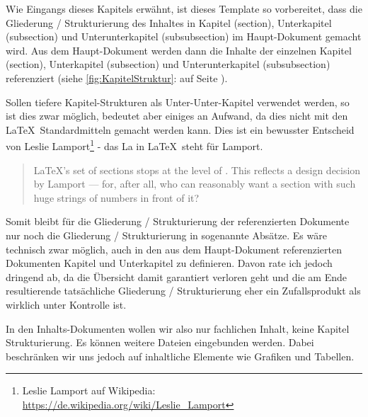 
Wie Eingangs dieses Kapitels erwähnt, ist dieses Template so vorbereitet, dass die Gliederung / Strukturierung des Inhaltes in Kapitel (section), Unterkapitel (subsection) und Unterunterkapitel (subsubsection) im Haupt-Dokument gemacht wird. Aus dem Haupt-Dokument werden dann die Inhalte der einzelnen  Kapitel (section), Unterkapitel (subsection) und Unterunterkapitel (subsubsection) referenziert (siehe \cref{fig:KapitelStruktur}:  auf Seite \pageref{fig:KapitelStruktur}).

Sollen tiefere Kapitel-Strukturen als Unter-Unter-Kapitel verwendet werden, so ist dies zwar möglich, bedeutet aber einiges an Aufwand, da dies nicht mit den \LaTeX\ Standardmitteln gemacht werden kann. Dies ist ein bewusster Entscheid von Leslie Lamport\footnote{Leslie Lamport auf Wikipedia: \url{https://de.wikipedia.org/wiki/Leslie_Lamport}} - das La in \LaTeX\ steht für Lamport\cite{Lamport2017}. 

\begin{quote}
    \begin{tcolorbox} 
        LaTeX’s set of \dq sections\dq{} stops at the level of .
        This reflects a design decision by Lamport — for, after all, 
        who can reasonably want a section with such huge strings of 
        numbers in front of it\cite{Tex2017}? 
    \end{tcolorbox}
\end{quote}

Somit bleibt für die Gliederung / Strukturierung der referenzierten Dokumente nur noch die Gliederung / Strukturierung in sogenannte Absätze. Es wäre technisch zwar möglich, auch in den aus dem Haupt-Dokument referenzierten Dokumenten Kapitel und Unterkapitel zu definieren. Davon rate ich jedoch dringend ab, da die Übersicht damit garantiert verloren geht und die am Ende resultierende tatsächliche Gliederung / Strukturierung eher ein Zufallsprodukt als wirklich unter Kontrolle ist. 

In den Inhalts-Dokumenten wollen wir also nur fachlichen Inhalt, keine Kapitel Strukturierung. Es können weitere Dateien eingebunden werden. Dabei beschränken wir uns jedoch auf inhaltliche Elemente wie Grafiken und Tabellen.
